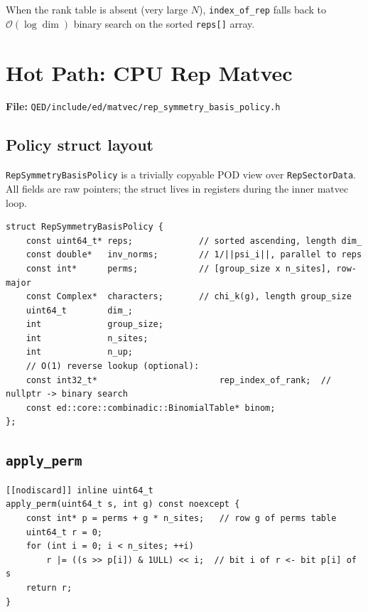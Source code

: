 \documentclass[11pt,a4paper]{article}
\begin{document}
When the rank table is absent (very large $N$), \texttt{index\_of\_rep} falls
back to $\mathcal{O}(\log \dim)$ binary search on the sorted \texttt{reps[]}
array.

\section{Hot Path: CPU Rep Matvec}
\label{sec:cpu}

\textbf{File:} \texttt{QED/include/ed/matvec/rep\_symmetry\_basis\_policy.h}

\subsection{Policy struct layout}

\texttt{RepSymmetryBasisPolicy} is a trivially copyable POD view over
\texttt{RepSectorData}.  All fields are raw pointers; the struct lives in
registers during the inner matvec loop.

\begin{lstlisting}[caption={RepSymmetryBasisPolicy member layout}]
struct RepSymmetryBasisPolicy {
    const uint64_t* reps;             // sorted ascending, length dim_
    const double*   inv_norms;        // 1/||psi_i||, parallel to reps
    const int*      perms;            // [group_size x n_sites], row-major
    const Complex*  characters;       // chi_k(g), length group_size
    uint64_t        dim_;
    int             group_size;
    int             n_sites;
    int             n_up;
    // O(1) reverse lookup (optional):
    const int32_t*                        rep_index_of_rank;  // nullptr -> binary search
    const ed::core::combinadic::BinomialTable* binom;
};
\end{lstlisting}

\subsection{\texttt{apply\_perm}}

\begin{lstlisting}[caption={Site-permutation application (scalar, N iterations)}]
[[nodiscard]] inline uint64_t
apply_perm(uint64_t s, int g) const noexcept {
    const int* p = perms + g * n_sites;   // row g of perms table
    uint64_t r = 0;
    for (int i = 0; i < n_sites; ++i)
        r |= ((s >> p[i]) & 1ULL) << i;  // bit i of r <- bit p[i] of s
    return r;
}
\end{lstlisting}
\end{document}
